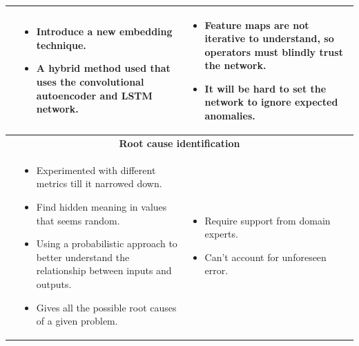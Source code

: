 \begin{longtable}{| p{25mm} | p{62mm} | p{62mm} |}
    \cite{zhang2019deep} &
    \vspace{-8mm}
    \begin{itemize}[leftmargin=3mm,noitemsep,nolistsep] 
        \item Introduce a new embedding technique.
        \item A hybrid method used that uses the convolutional autoencoder and LSTM network.
        \vspace{-7mm}
    \end{itemize} &
    \vspace{-8mm}
    \begin{itemize}[leftmargin=3mm,noitemsep,nolistsep] 
        \item Feature maps are not iterative to understand, so operators must blindly trust the network.
        \item It will be hard to set the network to ignore expected anomalies.
        \vspace{-7mm}
    \end{itemize} \\ \hline
    
    
    \multicolumn{3}{|c|}{\textbf{Root cause identification}} \\ \hline
        
    \cite{chigurupati2017root} &
    \vspace{-8mm}
    \begin{itemize}[leftmargin=3mm,noitemsep,nolistsep] 
        \item Experimented with different metrics till it narrowed down.
        \item Find hidden meaning in values that seems random.
        \item Using a probabilistic approach to better understand the relationship between inputs and outputs.
        \item Gives all the possible root causes of a given problem.
        \vspace{-7mm}
    \end{itemize} &
    \vspace{-8mm}
    \begin{itemize}[leftmargin=3mm,noitemsep,nolistsep] 
        \item Require support from domain experts.
        \item Can't account for unforeseen error.
        \vspace{-7mm}
    \end{itemize} \\ \hline
    

\end{longtable}
